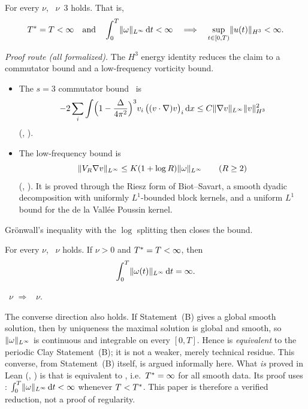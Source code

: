 \documentclass[11pt]{article}
\begin{document}
\begin{theorem}
For every $\nu$, ~$\nu$~$3$ holds. That is,
\[T^{*}=T<\infty\quad\text{and}\quad\int_0^T\lVert\omega\rVert_{L^\infty}\,\mathrm{d} t<\infty\quad\Longrightarrow\quad\sup_{t\in[0,T)}\lVert u(t)\rVert_{H^3}<\infty.\]
\end{theorem}
\emph{Proof route (all formalized).} The $H^3$ energy identity reduces the claim to a commutator bound and a low-frequency vorticity bound.
\begin{itemize}
\item The $s=3$ commutator bound~\cite{KatoPonce1988} is
\[-2\sum_i\int\Bigl(1-\frac{\Delta}{4\pi^2}\Bigr)^{3}v_i\,\bigl((v\cdot\nabla)v\bigr)_i\,\mathrm{d} x\le C\lVert\nabla v\rVert_{L^\infty}\lVert v\rVert_{H^3}^2\]
(\coined, ).
\item The low-frequency bound is
\[\lVert V_R\nabla v\rVert_{L^\infty}\le K(1+\log R)\lVert\omega\rVert_{L^\infty}\qquad(R\ge2)\]
(\coined, ). It is proved through the Riesz form of Biot--Savart, a smooth dyadic decomposition with uniformly $L^1$-bounded block kernels, and a uniform $L^1$ bound for the de la Vall\'ee Poussin kernel.
\end{itemize}
Gr\"onwall's inequality with the $\log$ splitting then closes the bound.

\begin{theorem}
For every $\nu$, ~$\nu$ holds. If $\nu>0$ and $T^{*}=T<\infty$, then
\[\int_0^T\lVert\omega(t)\rVert_{L^\infty}\,\mathrm{d} t=\infty.\]
\end{theorem}

\begin{theorem}
~$\nu$ $\Rightarrow$ ~$\nu$.
\end{theorem}

\begin{remark}
The converse direction also holds. If Statement~(B) gives a global smooth solution, then by uniqueness the maximal solution is global and smooth, so $\lVert\omega\rVert_{L^\infty}$ is continuous and integrable on every $[0,T]$. Hence  is \emph{equivalent} to the periodic Clay Statement~(B); it is not a weaker, merely technical residue. This converse, from Statement~(B) itself, is argued informally here. What \emph{is} proved in Lean (, ) is that  is equivalent to , i.e.\ $T^{*}=\infty$ for all smooth data. Its proof uses : $\int_0^T\lVert\omega\rVert_{L^\infty}\,\mathrm{d} t<\infty$ whenever $T<T^{*}$. This paper is therefore a verified reduction, not a proof of regularity.
\end{remark}
\end{document}
